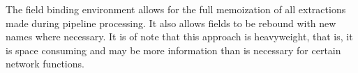 The field binding environment allows for the full memoization of all
extractions made during pipeline processing. It also allows fields to
be rebound with new names where necessary. It is of note that this
approach is heavyweight, that is, it is space consuming and may be
more information than is necessary for certain network functions.

%
%
%

